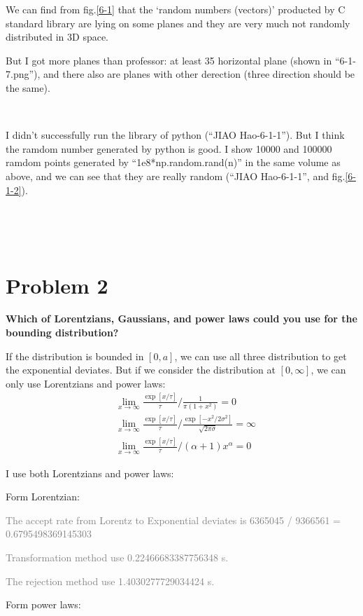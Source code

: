 \documentclass[showpacs, oneside, onecolumn, prl, amsmath, amssymb, nofootinbib, superscriptaddress, notitlepage]{revtex4-1}
\newcommand\bas{\begin{align*}}
\newcommand\gray{\textcolor{gray}}
\begin{document}
We can find from fig.\ref{6-1} that the `random numbers (vectors)' producted by C standard library are lying on some planes and they are very much not randomly distributed in 3D space. 

But I got more planes than professor: at least 35 horizontal plane (shown in ``6-1-7.png''), and there also are planes with other derection (three direction should be the same).

~~~~

I didn't successfully run the library of python (``JIAO Hao-6-1-1''). But I think the ramdom number generated by python is good. I show 10000 and 100000 ramdom points generated by ``1e8*np.random.rand(n)'' in the same volume as above, and we can see that they are really random (``JIAO Hao-6-1-1'', and fig.\ref{6-1-2}).


~~~~

~~~~

\section{Problem 2}

\textbf{Which of Lorentzians, Gaussians, and power laws could you use for the bounding distribution?}

If the distribution is bounded in $[0,a]$, we can use all three distribution to get the exponential deviates. But if we consider the distribution at $[0,\infty]$, we can only use Lorentzians and power laws:
\bas
&\lim_{x\rightarrow\infty}\frac{\exp[x/\tau]}{\tau}/\frac{1}{\pi(1+x^2)}=0\\
&\lim_{x\rightarrow\infty}\frac{\exp[x/\tau]}{\tau}/\frac{\exp[-x^2/2\sigma^2]}{\sqrt{2\pi\sigma}}=\infty\\
&\lim_{x\rightarrow\infty}\frac{\exp[x/\tau]}{\tau}/(\alpha+1)x^\alpha=0
\end{align*}

I use both Lorentzians and power laws:

Form Lorentzian:

\gray{The accept rate from Lorentz to Exponential deviates is 6365045 / 9366561 = 0.6795498369145303}

\gray{Transformation method use 0.22466683387756348 s.}

\gray{The rejection method use 1.4030277729034424 s.}~~~~

Form power laws:
\end{document}

